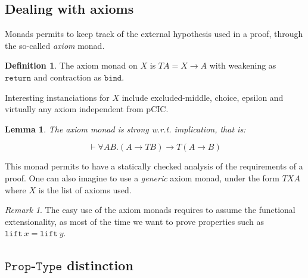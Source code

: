 \documentclass{article}
\newtheorem{lemma}{Lemma}
\theoremstyle{definition}
\newtheorem{definition}{Definition}
\theoremstyle{remark}
\newtheorem{remark}{Remark}
\begin{document}
\subsection{Dealing with axioms}

Monads permits to keep track of the external hypothesis used in a proof, through the so-called \emph{axiom} monad.

\begin{definition}
  The axiom monad on $X$ is $T A = X \rightarrow A$ with weakening as $\mathtt{return}$ and contraction as $\mathtt{bind}$.
\end{definition}

Interesting instanciations for $X$ include excluded-middle, choice, epsilon and virtually any axiom independent from pCIC.

\begin{lemma}
  The axiom monad is strong w.r.t. implication, that is:

$$\vdash \forall A B. (A \rightarrow T B) \rightarrow T (A \rightarrow B)$$
\end{lemma}


This monad permits to have a statically checked analysis of the requirements of a proof. One can also imagine to use a \emph{generic} axiom monad, under the form $T X A$ where $X$ is the list of axioms used.

\begin{remark}
  The easy use of the axiom monads requires to assume the functional extensionality, as most of the time we want to prove properties such as $\mathtt{lift}\ x = \mathtt{lift}\ y$.
\end{remark}


\subsection{$\mathtt{Prop}$-$\mathtt{Type}$ distinction}
\end{document}
